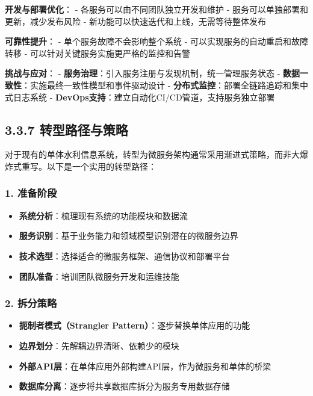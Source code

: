 \textbf{开发与部署优化}： - 各服务可以由不同团队独立开发和维护 -
服务可以单独部署和更新，减少发布风险 -
新功能可以快速迭代和上线，无需等待整体发布

\textbf{可靠性提升}： - 单个服务故障不会影响整个系统 -
可以实现服务的自动重启和故障转移 -
可以针对关键服务实施更严格的监控和告警

\textbf{挑战与应对}： -
\textbf{服务治理}：引入服务注册与发现机制，统一管理服务状态 -
\textbf{数据一致性}：实施最终一致性模型和事件驱动设计 -
\textbf{分布式监控}：部署全链路追踪和集中式日志系统 -
\textbf{DevOps支持}：建立自动化CI/CD管道，支持服务独立部署

\subsection{3.3.7
转型路径与策略}\label{ux8f6cux578bux8defux5f84ux4e0eux7b56ux7565}

对于现有的单体水利信息系统，转型为微服务架构通常采用渐进式策略，而非大爆炸式重写。以下是一个实用的转型路径：

\subsubsection{1. 准备阶段}\label{ux51c6ux5907ux9636ux6bb5}

\begin{itemize}
\tightlist
\item
  \textbf{系统分析}：梳理现有系统的功能模块和数据流
\item
  \textbf{服务识别}：基于业务能力和领域模型识别潜在的微服务边界
\item
  \textbf{技术选型}：选择适合的微服务框架、通信协议和部署平台
\item
  \textbf{团队准备}：培训团队微服务开发和运维技能
\end{itemize}

\subsubsection{2. 拆分策略}\label{ux62c6ux5206ux7b56ux7565}

\begin{itemize}
\tightlist
\item
  \textbf{扼制者模式（Strangler Pattern）}：逐步替换单体应用的功能
\item
  \textbf{边界划分}：先解耦边界清晰、依赖少的模块
\item
  \textbf{外部API层}：在单体应用外部构建API层，作为微服务和单体的桥梁
\item
  \textbf{数据库分离}：逐步将共享数据库拆分为服务专用数据存储
\end{itemize}

